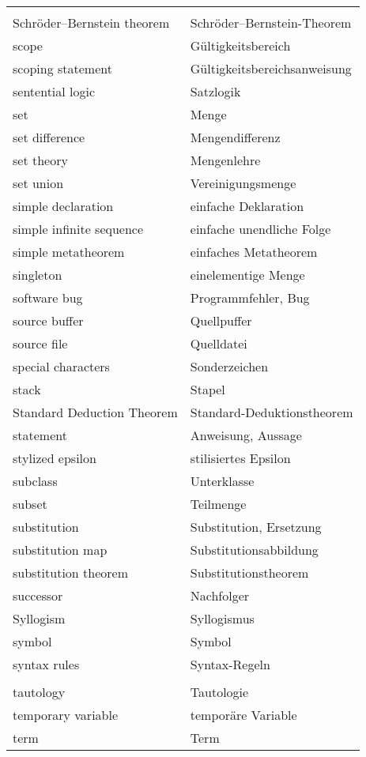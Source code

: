 \begin{longtabu}   { @{} X[l] X[l] }
     & \\
    Schröder--Bernstein theorem & Schröder--Bernstein-{\allowbreak}Theorem \\
    scope & Gültigkeitsbereich \\
    scoping statement & Gültigkeitsbereichsanweisung \\
    sentential logic & Satzlogik \\
    set & Menge \\
    set difference & Mengendifferenz \\
    set theory & Mengenlehre \\
    set union & Vereinigungsmenge \\
    simple declaration & einfache Deklaration \\
    simple infinite sequence & einfache unendliche Folge \\
    simple metatheorem & einfaches Metatheorem \\
    singleton & einelementige Menge \\
    software bug & Programmfehler, Bug \\
    source buffer & Quellpuffer \\
    source file & Quelldatei \\
    special characters & Sonderzeichen \\
    stack & Stapel \\
    Standard Deduction Theorem & Standard-Deduktionstheorem \\
    statement & Anweisung, Aussage \\
    stylized epsilon & stilisiertes Epsilon \\
    subclass & Unterklasse \\
    subset & Teilmenge \\
    substitution & Substitution, Ersetzung \\
    substitution map & Substitutionsabbildung \\
    substitution theorem & Substitutionstheorem \\
    successor & Nachfolger \\
    Syllogism & Syllogismus \\
    symbol & Symbol \\
    syntax rules & Syntax-Regeln \\
     & \\
    tautology & Tautologie \\
    temporary variable & temporäre Variable \\
    term & Term \\

\end{longtabu}
